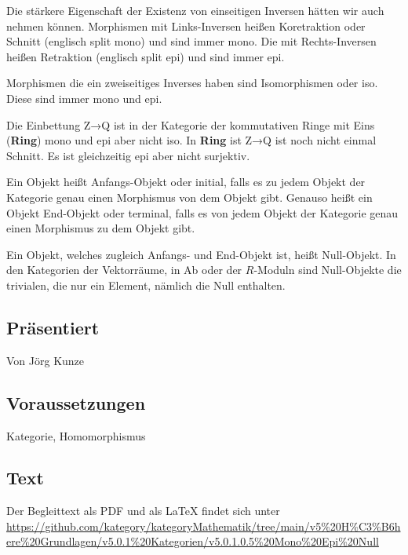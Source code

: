 \documentclass[a4paper]{amsart}
\theoremstyle{definition}
\begin{document}
Die stärkere Eigenschaft der Existenz von einseitigen Inversen hätten wir auch nehmen können. Morphismen mit Links-Inversen heißen Koretraktion oder Schnitt (englisch split mono) und sind immer mono. Die mit Rechts-Inversen heißen Retraktion (englisch split epi) und sind immer epi. 

Morphismen die ein zweiseitiges Inverses haben sind Isomorphismen oder iso. Diese sind immer mono und epi.

Die Einbettung Z→Q ist in der Kategorie der kommutativen Ringe mit Eins (\textbf{Ring}) mono und epi aber nicht iso.
In \textbf{Ring} ist Z→Q ist noch nicht einmal Schnitt. Es ist gleichzeitig epi aber nicht surjektiv.

Ein Objekt heißt Anfangs-Objekt oder initial, falls es zu jedem Objekt der Kategorie genau einen Morphismus von dem Objekt gibt. Genauso heißt ein Objekt End-Objekt oder terminal, falls es von jedem Objekt der Kategorie genau einen Morphismus zu dem Objekt gibt.

Ein Objekt, welches zugleich Anfangs- und End-Objekt ist, heißt Null-Objekt. In den Kategorien der Vektorräume, in Ab oder der $R$-Moduln sind Null-Objekte die trivialen, die nur ein Element, nämlich die Null enthalten.

\subsection*{Präsentiert}
Von Jörg Kunze

\subsection*{Voraussetzungen}
Kategorie, Homomorphismus

\subsection*{Text}
Der Begleittext als PDF und als LaTeX findet sich unter
{\tiny
   \url{https://github.com/kategory/kategoryMathematik/tree/main/v5%20H%C3%B6here%20Grundlagen/v5.0.1%20Kategorien/v5.0.1.0.5%20Mono%20Epi%20Null}
}
\end{document}
